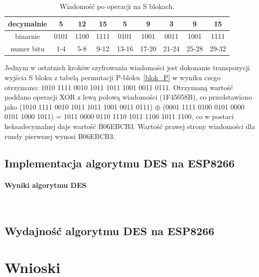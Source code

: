 \documentclass[12p]{article}
\begin{document}
\begin{table}[H]
\centering
\begin{tabular}{|c|c|c|c|c|c|c|c|c|} 
\hline
decymalnie &5 &12& 15& 5& 9& 3& 9& 15\\ \hline
binarnie & 0101& 1100& 1111& 0101& 1001& 0011& 1001& 1111\\ \hline
numer bitu &1-4 &5-8& 9-12& 13-16& 17-20& 21-24& 25-28& 29-32\\ \hline
\end{tabular}
\caption{Wiadomość po operacji na S blokach.}\label{sbok_wynik}
\end{table}

Jednym w ostatnich kroków szyfrowania wiadomości jest dokonanie transpozycji wyjścia S bloku z tabelą permutacji P-bloku~\ref{blok_P} w wyniku czego otrzymano: 1010 1111 0010 1011 1011 1001 0011 0111. Otrzymaną wartość poddano operacji XOR z lewą połową wiadomości (1F45058B), co przedstawiono jako (1010 1111 0010 1011 1011 1001 0011 0111) $\oplus$ (0001 1111 0100 0101 0000 0101 1000 1011) = 1011 0000 0110 1110 1011 1100 1011 1100, co w postaci heksadecymalnej daje wartość B06EBCB3. Wartość prawej strony wiadomości dla rundy pierwszej wynosi B06EBCB3. 

\subsection{Implementacja algorytmu DES na ESP8266}



\paragraph{Wyniki algorytmu DES}\mbox{} \\


\subsection{Wydajność algorytmu DES na ESP8266} 
\newpage
\section{Wnioski}
\end{document}

